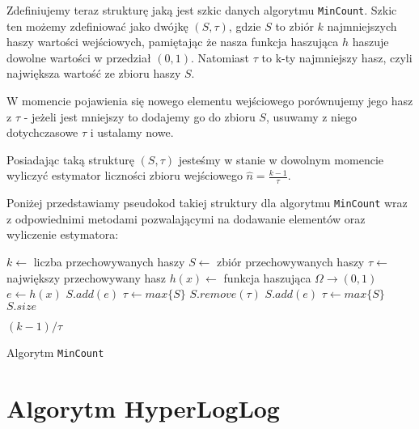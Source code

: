 Zdefiniujemy teraz strukturę jaką jest szkic danych algorytmu \texttt{MinCount}. Szkic ten możemy zdefiniować jako dwójkę $(S, {\tau})$, gdzie $S$ to zbiór $k$ najmniejszych haszy wartości wejściowych, pamiętając że nasza funkcja haszująca $h$ haszuje dowolne wartości w przedział $(0,1)$. Natomiast ${\tau}$ to k-ty najmniejszy hasz, czyli największa wartość ze zbioru haszy $S$.

W momencie pojawienia się nowego elementu wejściowego porównujemy jego hasz z ${\tau}$ - jeżeli jest mniejszy to dodajemy go do zbioru $S$, usuwamy z niego dotychczasowe ${\tau}$ i ustalamy nowe. 

Posiadając taką strukturę $(S, {\tau})$ jesteśmy w stanie w dowolnym momencie wyliczyć estymator liczności zbioru wejściowego $\hat{n} = \frac{k - 1}{{\tau}}$.

Poniżej przedstawiamy pseudokod takiej struktury dla algorytmu \texttt{MinCount} wraz z odpowiednimi metodami pozwalającymi na dodawanie elementów oraz wyliczenie estymatora:
\newline
\begin{algorithm}
    \begin{algorithmic}
    \State $k \gets $ liczba przechowywanych haszy 
    \State $S \gets $ zbiór przechowywanych haszy
    \State $\tau \gets $ największy przechowywany hasz 
    \State $h(x) \gets $ funkcja haszująca $\Omega \rightarrow (0, 1)$
    \newline
        \State $e \gets h(x)$
                \State $S.add(e)$
                \State $\tau \gets max\{S\}$
                \State $S.remove(\tau)$
                \State $S.add(e)$
                \State $\tau \gets max\{S\}$
            \EndIf
        \EndIf
    \EndFunction
    \newline
            \State \Return $S.size$
        
        \Else 
            \State \Return $(k - 1) / \tau$
        \EndIf
    \EndFunction
    
    \end{algorithmic}
    \caption{Algorytm \texttt{MinCount}}
\end{algorithm}

\newpage

\section{Algorytm HyperLogLog}

